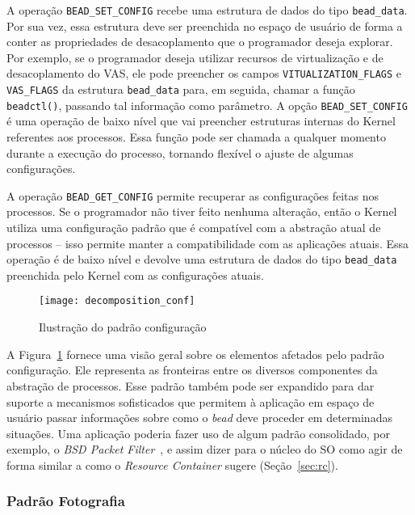 A operação \texttt{BEAD\_SET\_CONFIG} recebe uma estrutura de dados do tipo
\texttt{bead\_data}. Por sua vez, essa estrutura deve ser preenchida no espaço
de usuário de forma a conter as propriedades de desacoplamento que o
programador deseja explorar. Por exemplo, se o programador deseja utilizar
recursos de virtualização e de desacoplamento do VAS, ele pode preencher os
campos \texttt{VITUALIZATION\_FLAGS} e \texttt{VAS\_FLAGS} da estrutura
\texttt{bead\_data} para, em seguida, chamar a função \texttt{beadctl()},
passando tal informação como parâmetro. A opção \texttt{BEAD\_SET\_CONFIG} é
uma operação de baixo nível que vai preencher estruturas internas do Kernel
referentes aos processos. Essa função pode ser chamada a qualquer
momento durante a execução do processo, tornando flexível o ajuste de algumas
configurações.

A operação \texttt{BEAD\_GET\_CONFIG} permite recuperar as configurações feitas
nos processos. Se o programador não tiver feito nenhuma alteração, então o
Kernel utiliza uma configuração padrão que é compatível com a abstração atual
de processos -- isso permite manter a compatibilidade com as
aplicações atuais. Essa operação é de baixo nível e devolve uma estrutura de dados
do tipo \texttt{bead\_data} preenchida pelo Kernel com as configurações atuais.

\begin{figure}[!h]
  \centering
  \texttt{[image: decomposition\_conf]}
  \caption{Ilustração do padrão configuração}
  \label{fig:decomposicao_conf}
\end{figure}

A Figura~\ref{fig:decomposicao_conf} fornece uma visão geral sobre os elementos
afetados pelo padrão configuração. Ele representa as fronteiras entre
os diversos componentes da abstração de processos. Esse padrão também pode ser
expandido para dar suporte a mecanismos sofisticados que permitem à
aplicação em espaço de usuário passar informações sobre como o \emph{bead}
deve proceder em determinadas situações. Uma aplicação poderia fazer uso de
algum padrão consolidado, por exemplo, o \emph{BSD Packet Filter}~\citep{bpf}, e
assim dizer para o núcleo do SO como agir de forma similar a como o
\emph{Resource Container} sugere (Seção~\ref{sec:rc}).

\subsubsection{Padrão Fotografia}
\label{sec:fotografia}


